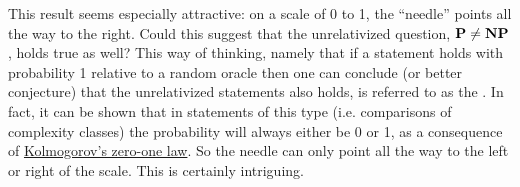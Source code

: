 This result seems especially attractive: on a scale of 0 to 1, the ``needle'' points all the way to the right. Could this suggest that the unrelativized question, $\textbf{P} \neq \textbf{NP}$, holds true as well? This way of thinking, namely that if a statement holds with probability 1 relative to a random oracle then one can conclude (or better conjecture) that the unrelativized statements also holds, is referred to as the . In fact, it can be shown that in statements of this type (i.e. comparisons of complexity classes) the probability will always either be 0 or 1, as a consequence of \href{https://en.wikipedia.org/wiki/Kolmogorov%27s_zero%E2%80%93one_law}{Kolmogorov's zero-one law}. So the needle can only point all the way to the left or right of the scale. This is certainly intriguing.


